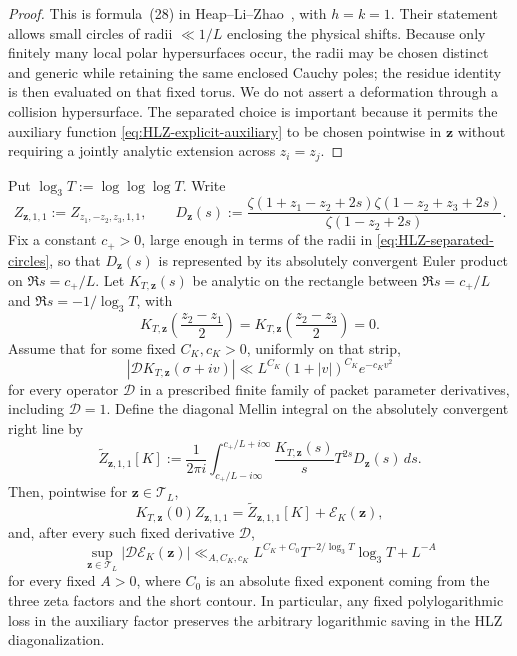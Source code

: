 \begin{proof}
This is formula~(28) in Heap--Li--Zhao~\cite{HLZ}, with $h=k=1$.
Their statement allows small circles of radii $\ll1/L$ enclosing the physical
shifts.  Because only finitely many local polar hypersurfaces occur, the radii
may be chosen distinct and generic while retaining the same enclosed Cauchy
poles; the residue identity is then evaluated on that fixed torus.  We do not
assert a deformation through a collision hypersurface.  The separated choice
is important because it permits the auxiliary function
\eqref{eq:HLZ-explicit-auxiliary} to be chosen pointwise in $\mathbf z$ without
requiring a jointly analytic extension across $z_i=z_j$.
\end{proof}

\begin{lemma}
\label{lem:parametric-HLZ-diagonal}
Put $\log_3T:=\log\log\log T$. Write
\[
 Z_{\mathbf z,1,1}:=Z_{z_1,-z_2,z_3,1,1},
 \qquad
 D_{\mathbf z}(s):=
 \frac{\zeta(1+z_1-z_2+2s)\zeta(1-z_2+z_3+2s)}
      {\zeta(1-z_2+2s)}.
\]
Fix a constant $c_+>0$, large enough in terms of the radii in
\eqref{eq:HLZ-separated-circles}, so that $D_{\mathbf z}(s)$ is represented by
its absolutely convergent Euler product on $\Re s=c_+/L$.  Let
$K_{T,\mathbf z}(s)$ be analytic on the rectangle between
$\Re s=c_+/L$ and $\Re s=-1/\log_3T$, with
\[
 K_{T,\mathbf z}\!\left(\frac{z_2-z_1}{2}\right)=
 K_{T,\mathbf z}\!\left(\frac{z_2-z_3}{2}\right)=0.
\]
Assume that for some fixed $C_K,c_K>0$, uniformly on that strip,
\begin{equation}
 \left|\mathcal D K_{T,\mathbf z}(\sigma+iv)\right|
 \ll L^{C_K}(1+|v|)^{C_K}e^{-c_Kv^2}
 \label{eq:parametric-HLZ-K-bound}
\end{equation}
for every operator $\mathcal D$ in a prescribed finite family of packet
parameter derivatives, including $\mathcal D=1$.  Define the diagonal Mellin
integral on the absolutely convergent right line by
\begin{equation}
 \widetilde Z_{\mathbf z,1,1}[K]
 :=\frac1{2\pi i}\int_{c_+/L-i\infty}^{c_+/L+i\infty}
 \frac{K_{T,\mathbf z}(s)}s T^{2s}D_{\mathbf z}(s)\,ds.
 \label{eq:parametric-HLZ-diagonal-integral}
\end{equation}
Then, pointwise for $\mathbf z\in\mathcal T_L$,
\begin{equation}
 K_{T,\mathbf z}(0)Z_{\mathbf z,1,1}
 =\widetilde Z_{\mathbf z,1,1}[K]
 +\mathcal E_K(\mathbf z),
 \label{eq:parametric-HLZ-diagonal}
\end{equation}
and, after every such fixed derivative $\mathcal D$,
\begin{equation}
 \sup_{\mathbf z\in\mathcal T_L}
 |\mathcal D\mathcal E_K(\mathbf z)|
 \ll_{A,C_K,c_K}
 L^{C_K+C_0}T^{-2/\log_3T}\log_3T+L^{-A}
 \label{eq:parametric-HLZ-error}
\end{equation}
for every fixed $A>0$, where $C_0$ is an absolute fixed exponent coming from
the three zeta factors and the short contour.  In particular, any fixed
polylogarithmic loss in the auxiliary factor preserves the arbitrary
logarithmic saving in the HLZ diagonalization.
\end{lemma}

